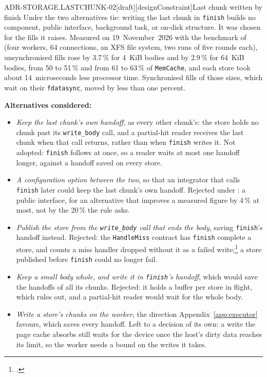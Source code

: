 \begin{requirement}{ADR-STORAGE.LASTCHUNK-02}[draft][designConstraint]{Last chunk written by finish}
  Under  the two alternatives tie: writing the last
  chunk in \texttt{finish} builds no component, public interface, background
  task, or on-disk structure. It was chosen for the fills it raises.
  Measured on 19~November~2026 with the benchmark of
   (four workers, 64 connections, an XFS
  file system, two runs of five rounds each), unsynchronised fills rose by
  3.7\,\% for 4~KiB bodies and by 2.9\,\% for 64~KiB bodies, from 50 to 51\,\%
  and from 61 to 63\,\% of \texttt{MemCache}, and each store took about
  14~microseconds less processor time. Synchronised fills of those sizes,
  which wait on their \texttt{fdatasync}, moved by less than one percent.

  \textbf{Alternatives considered:}
  \begin{itemize}
    \item \emph{Keep the last chunk's own handoff}, as every other chunk's:
      the store holds no chunk past its \texttt{write\_body} call, and a
      partial-hit reader receives the last chunk when that call returns,
      rather than when \texttt{finish} writes it. Not adopted:
      \texttt{finish} follows at once, so a reader waits at most one handoff
      longer, against a handoff saved on every store.
    \item \emph{A configuration option between the two}, so that an
      integrator that calls \texttt{finish} later could keep the last
      chunk's own handoff. Rejected under : a public
      interface, for an alternative that improves a measured figure by 4\,\%
      at most, not by the 20\,\% the rule asks.
    \item \emph{Publish the store from the \texttt{write\_body} call that
      ends the body}, saving \texttt{finish}'s handoff instead. Rejected: the
      \texttt{HandleMiss} contract has \texttt{finish} complete a store, and
      counts a miss handler dropped without it as a failed
      write;\footnote{.}
      a store published before \texttt{finish} could no longer fail.
    \item \emph{Keep a small body whole, and write it in \texttt{finish}'s
      handoff}, which would save the handoffs of all its chunks. Rejected: it
      holds a buffer per store in flight, which
       rules out, and a partial-hit reader
      would wait for the whole body.
    \item \emph{Write a store's chunks on the worker}, the direction
      Appendix~\ref{app:executor} favours, which saves every handoff. Left
      to a decision of its own: a write the page cache absorbs still waits
      for the device once the host's dirty data reaches its limit, so the
      worker needs a bound on the writes it takes.
  \end{itemize}


\end{requirement}
